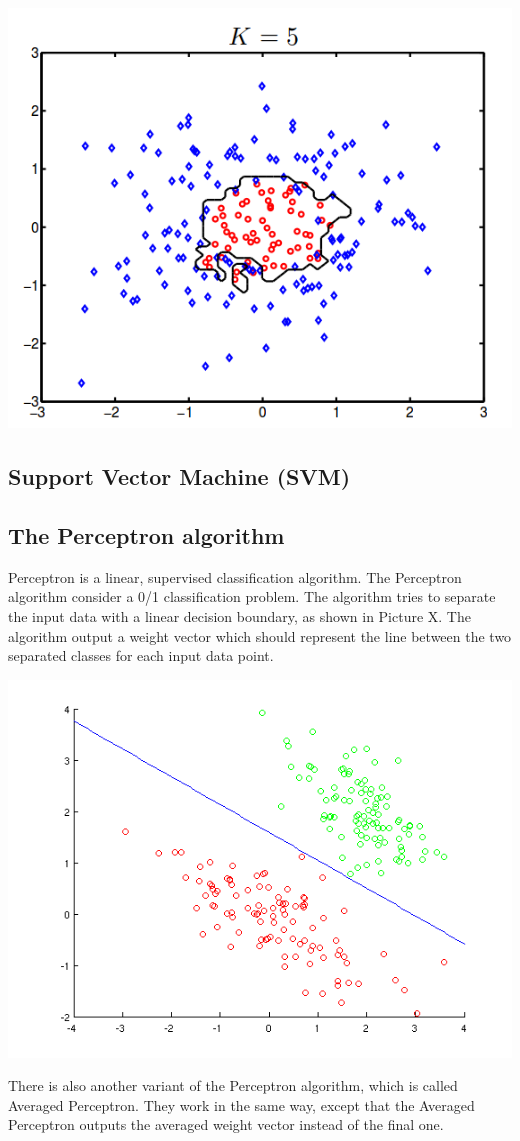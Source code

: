 \begin{center}
\includegraphics[scale=0.5]{fig/KNN.png}
\end{center}

\subsection{Support Vector Machine (SVM)}

\subsection{The Perceptron algorithm}
Perceptron is a linear, supervised classification algorithm. The Perceptron algorithm consider a 0/1 classification problem.
The algorithm tries to separate the input data with a linear decision boundary, as shown in Picture X. The algorithm output a weight vector which should represent the line between the two separated classes for each input data point. \citep{perceptron_url}
\begin{center}
\includegraphics[scale = 0.5]{fig/perceptron_example.png}
\end{center}
There is also another variant of the Perceptron algorithm, which is called Averaged Perceptron. They work in the same way, except that the Averaged Perceptron outputs the averaged weight vector instead of the final one.

